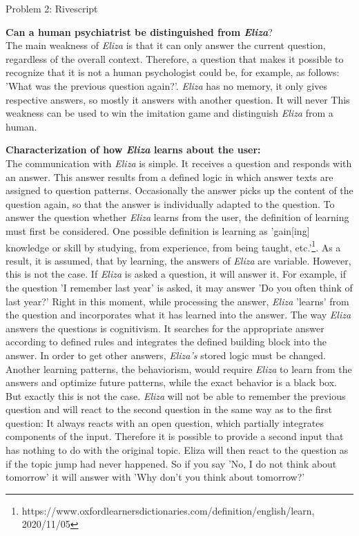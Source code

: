 \documentclass[12pt,a4paper]{article}
\begin{document}
{
\begin{center}
\begin{Large}
Problem 2: Rivescript
\end{Large}
\end{center}
\textbf{Can a human psychiatrist be distinguished from \textit{Eliza}}?\\

The main weakness of \textit{Eliza} is that it can only answer the current question, regardless of the overall context. 
Therefore, a question that makes it possible to recognize that it is not a human psychologist could be, for example, as follows: 'What was the previous question again?'.
\textit{Eliza} has no memory, it only gives respective answers, so mostly it answers with another question. It will never This weakness can be used to win the imitation game and distinguish \textit{Eliza} from a human.
\newline


\noindent \textbf{Characterization of how \textit{Eliza} learns about the user:}\\

The communication with \textit{Eliza} is simple. It receives a question and responds with an answer. This answer results from a defined logic in which answer texts are assigned to question patterns. Occasionally the answer picks up the content of the question again, so that the answer is individually adapted to the question. 
To answer the question whether \textit{Eliza} learns from the user, the definition of learning must first be considered. One possible definition is learning as 'gain[ing] knowledge or skill by studying, from experience, from being taught, etc.'\footnote{https://www.oxfordlearnersdictionaries.com/definition/english/learn, 2020/11/05}. As a result, it is assumed, that by learning, the answers of \textit{Eliza} are variable. However, this is not the case. If \textit{Eliza} is asked a question, it will answer it. For example, if the question 'I remember last year' is asked, it may answer 'Do you often think of last year?' Right in this moment, while processing the answer, \textit{Eliza} 'learns' from the question and incorporates what it has learned into the answer. The way \textit{Eliza} answers the questions is cognitivism. It searches for the appropriate answer according to defined rules and integrates the defined building block into the answer. In order to get other answers, \textit{Eliza's} stored logic must be changed. Another learning patterns, the behaviorism, would require \textit{Eliza} to learn from the answers and optimize future patterns, while the exact behavior is a black box. But exactly this is not the case. \textit{Eliza} will not be able to remember the previous question and will react to the second question in the same way as to the first question: It always reacts with an open question, which partially integrates components of the input. Therefore it is possible to provide a second input that has nothing to do with the original topic. Eliza will then react to the question as if the topic jump had never happened. So if you say 'No, I do not think about tomorrow' it will answer with 'Why don't you think about tomorrow?'\\ 

}
\end{document}

